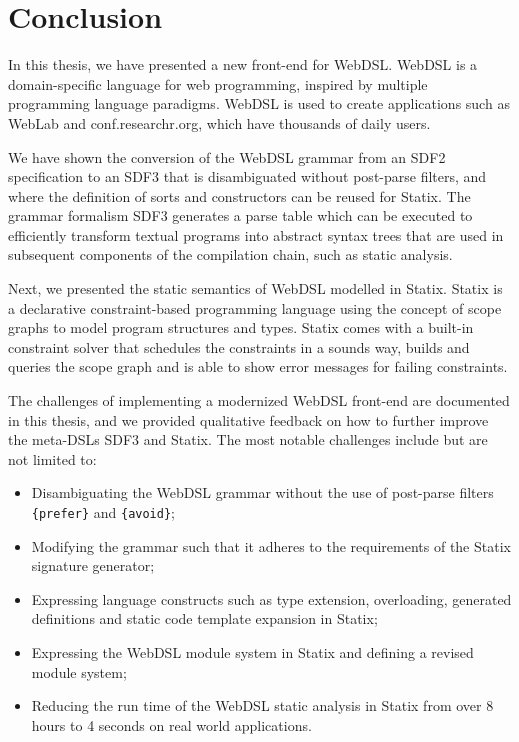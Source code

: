 
\chapter{\label{chap:conclusion}Conclusion}

  In this thesis, we have presented a new front-end for WebDSL. WebDSL is a domain-specific language for web programming, inspired by multiple programming language paradigms. WebDSL is used to create applications such as WebLab and conf.researchr.org, which have thousands of daily users.

  We have shown the conversion of the WebDSL grammar from an SDF2 specification to an SDF3 that is disambiguated without post-parse filters, and where the definition of sorts and constructors can be reused for Statix. The grammar formalism SDF3 generates a parse table which can be executed to efficiently transform textual programs into abstract syntax trees that are used in subsequent components of the compilation chain, such as static analysis.

  Next, we presented the static semantics of WebDSL modelled in Statix. Statix is a declarative constraint-based programming language using the concept of scope graphs to model program structures and types. Statix comes with a built-in constraint solver that schedules the constraints in a sounds way, builds and queries the scope graph and is able to show error messages for failing constraints.

  The challenges of implementing a modernized WebDSL front-end are documented in this thesis, and we provided qualitative feedback on how to further improve the meta-DSLs SDF3 and Statix. The most notable challenges include but are not limited to:
  
  \begin{itemize}
    \item Disambiguating the WebDSL grammar without the use of post-parse filters \texttt{\{prefer\}} and \texttt{\{avoid\}};
    \item Modifying the grammar such that it adheres to the requirements of the Statix signature generator;
    \item Expressing language constructs such as type extension, overloading, generated definitions and static code template expansion in Statix;
    \item Expressing the WebDSL module system in Statix and defining a revised module system;
    \item Reducing the run time of the WebDSL static analysis in Statix from over 8 hours to 4 seconds on real world applications.
  \end{itemize}


